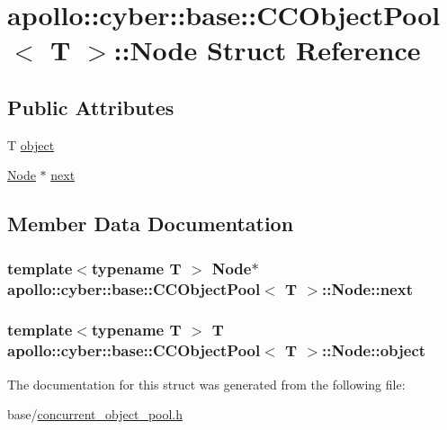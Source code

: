 \hypertarget{structapollo_1_1cyber_1_1base_1_1CCObjectPool_1_1Node}{\section{apollo\-:\-:cyber\-:\-:base\-:\-:C\-C\-Object\-Pool$<$ T $>$\-:\-:Node Struct Reference}
\label{structapollo_1_1cyber_1_1base_1_1CCObjectPool_1_1Node}
}
\subsection*{Public Attributes}
\begin{DoxyCompactItemize}
\item 
T \hyperlink{structapollo_1_1cyber_1_1base_1_1CCObjectPool_1_1Node_a1a77b93787b4f6a76e3af7e59c48d331}{object}
\item 
\hyperlink{structapollo_1_1cyber_1_1base_1_1CCObjectPool_1_1Node}{Node} $\ast$ \hyperlink{structapollo_1_1cyber_1_1base_1_1CCObjectPool_1_1Node_ab9cffe2cbaba864c115a0ee01572f4d6}{next}
\end{DoxyCompactItemize}


\subsection{Member Data Documentation}
\hypertarget{structapollo_1_1cyber_1_1base_1_1CCObjectPool_1_1Node_ab9cffe2cbaba864c115a0ee01572f4d6}{
\subsubsection[{next}]{\setlength{\rightskip}{0pt plus 5cm}template$<$typename T $>$ {\bf Node}$\ast$ {\bf apollo\-::cyber\-::base\-::\-C\-C\-Object\-Pool}$<$ T $>$\-::Node\-::next}}\label{structapollo_1_1cyber_1_1base_1_1CCObjectPool_1_1Node_ab9cffe2cbaba864c115a0ee01572f4d6}
\hypertarget{structapollo_1_1cyber_1_1base_1_1CCObjectPool_1_1Node_a1a77b93787b4f6a76e3af7e59c48d331}{
\subsubsection[{object}]{\setlength{\rightskip}{0pt plus 5cm}template$<$typename T $>$ T {\bf apollo\-::cyber\-::base\-::\-C\-C\-Object\-Pool}$<$ T $>$\-::Node\-::object}}\label{structapollo_1_1cyber_1_1base_1_1CCObjectPool_1_1Node_a1a77b93787b4f6a76e3af7e59c48d331}


The documentation for this struct was generated from the following file\-:\begin{DoxyCompactItemize}
\item 
base/\hyperlink{concurrent__object__pool_8h}{concurrent\-\_\-object\-\_\-pool.\-h}\end{DoxyCompactItemize}
